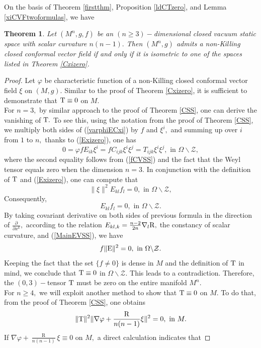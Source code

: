 \documentclass[10pt,leqno,oneside]{amsart}
\newtheorem{Thm}{Theorem}
\begin{document}
{       On the basis of Theorem \ref{firstthm}, Proposition \ref{ldCTzero}, and Lemma \ref{xiCVFtwoformulas}, we have
    \begin{Thm}\label{VSSCVF}
       Let $(M^n, g, f)$ be an $(n\ge3)-$dimensional closed vacuum static space with scalar curvature $n(n-1).$ Then $(M^n, g)$ admits a non-Killing closed conformal vector field if and only if it is isometric to one of the spaces listed in Theorem {\rm\ref{Cxizero}}.
    \end{Thm}
    \begin{proof}
       Let $\varphi$ be characteristic function of a non-Killing closed conformal vector field $\xi$ on $(M, g)$. Similar to the proof of Theorem \ref{Cxizero}, it is sufficient to demonstrate that ${\rm T}\equiv 0$ on $M.$ \\
       For $n=3,$ by similar approach to the proof of Theorem \ref{CSS}, one can derive the vanishing of ${\rm T}.$ To see this, using the notation from the proof of Theorem \ref{CSS}, we multiply both sides of (\ref{varphiECxi}) by $f$ and $\xi^i,$ and summing up over $i$ from $1$ to $n,$ thanks to (\ref{Exizero}), one has
       \[0=\varphi fE_{ik}\xi^i=fC_{ijk}\xi^i\xi^j=T_{ijk}\xi^i\xi^j,\text{~in~} \Omega\backslash \mathcal{Z},\]
       where the second equality follows from (\ref{fCVSS}) and the fact that the Weyl tensor equals zero when the dimension $n=3.$ In conjunction with the definition of ${\rm T}$ and (\ref{Exizero}), one can compute that
       \[\|\xi\|^2E_{kl}f_l=0,\text{~in~} \Omega\backslash \mathcal{Z},\]
       Consequently,
       \[E_{kl}f_l=0,\text{~in~} \Omega\backslash \mathcal{Z}.\]
       By taking covariant derivative on both sides of previous formula in the direction of $\frac{\partial}{\partial x^k},$ according to the relation $E_{kl,k}=\frac{n-2}{2n}\nabla_l{\rm R},$ the constancy of scalar curvature, and (\ref{MainEVSS}), we have
       \[f\|{\rm E}\|^2=0,\text{~in~} \Omega\backslash \mathcal{Z}.\]
       Keeping the fact that the set $\{f\neq0\}$ is dense in $M$ and the definition of ${\rm T}$ in mind, we conclude that ${\rm T}\equiv0$ in $\Omega\backslash \mathcal{Z}.$ This leads to a contradiction. Therefore, the $(0,3)-$tensor ${\rm T}$ must be zero on the entire manifold $M^n.$\\
       For $n\geq4,$ we will exploit another method to show that ${\rm T}\equiv 0$ on $M.$ To do that, from the proof of Theorem {\rm\ref{CSS}}, one obtains
       \[\|{\rm T}\|^2\|\nabla\varphi+\frac{\operatorname R}{n(n-1)}\xi\|^2=0,\text{~in~} M.\]
       If $\nabla\varphi+\frac{\operatorname R}{n(n-1)}\xi\equiv0$ on $M,$ a direct calculation indicates that

\end{proof}}
\end{document}
